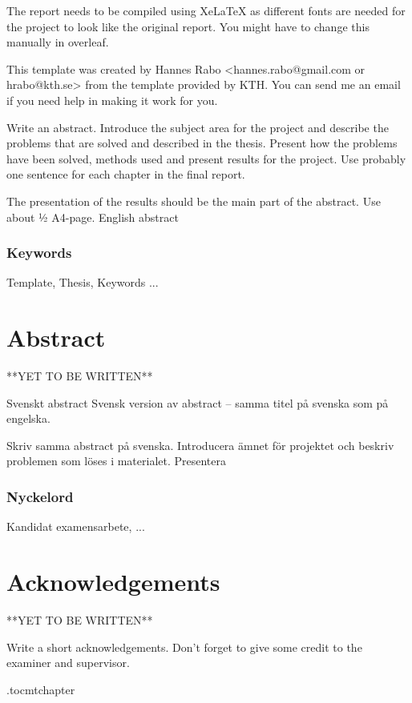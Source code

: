 The report needs to be compiled using XeLaTeX as different fonts are needed for the project to look like the original report. You might have to change this manually in overleaf.

This template was created by Hannes Rabo <hannes.rabo@gmail.com or hrabo@kth.se> from the template provided by KTH. You can send me an email if you need help in making it work for you.


\vspace{2cm}
Write an abstract. Introduce the subject area for the project and describe the problems that are solved and described in the thesis. Present how the problems have been solved, methods used and present results for the project. Use probably one sentence for each chapter in the final report.

The presentation of the results should be the main part of the abstract. Use about ½ A4-page.
English abstract

\subsection*{Keywords}
Template, Thesis, Keywords ...

\newpage
\thispagestyle{plain}
\chapter*{Abstract} 
**YET TO BE WRITTEN**


Svenskt abstract 
Svensk version av abstract – samma titel på svenska som på engelska.

Skriv samma abstract på svenska. Introducera ämnet för projektet och beskriv problemen som löses i materialet. Presentera 

\subsection*{Nyckelord}
Kandidat examensarbete, ...

\newpage
\thispagestyle{plain}
\chapter*{Acknowledgements}
**YET TO BE WRITTEN**


Write a short acknowledgements. Don't forget to give some credit to the examiner and supervisor.

\newpage



\newpage

\etocdepthtag.toc{mtchapter}
\thispagestyle{plain}
\tableofcontents

\newpage


